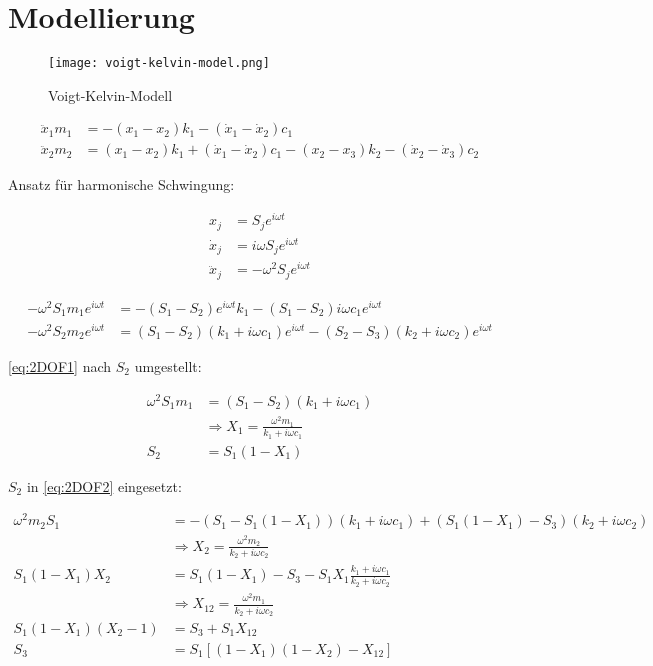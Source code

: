 \section{Modellierung}
\label{sec:modellierung}






\begin{figure}[ht]
    \centering
    \texttt{[image: voigt-kelvin-model.png]}
    \caption{Voigt-Kelvin-Modell}
\end{figure}

\begin{align}
\ddot x_1 m_1 &= -(x_1 - x_2) k_1 -(\dot x_1 - \dot x_2) c_1\\
\ddot x_2 m_2 &= (x_1 - x_2) k_1 + (\dot x_1 - \dot x_2) c_1 - (x_2 - x_3) k_2 - (\dot x_2 - \dot x_3) c_2
\end{align}

Ansatz für harmonische Schwingung:

\begin{align*}
x_j &= S_j e^{i \omega t}\\
\dot x_j &= i \omega S_j e^{i \omega t}\\
\ddot x_j &= - \omega^2 S_j e^{i \omega t}
\end{align*}

\begin{align}
- \omega^2 S_1 m_1 e^{i \omega t} &= - (S_1 - S_2) e^{i \omega t} k_1 - (S_1 - S_2) i \omega c_1 e^{i \omega t} \label{eq:2DOF1} \\
- \omega^2 S_2 m_2 e^{i \omega t} &= (S_1 - S_2)(k_1 + i \omega c_1) e^{i \omega t} - (S_2 - S_3)(k_2 + i \omega c_2) e^{i \omega t} \label{eq:2DOF2}
\end{align}

\cref{eq:2DOF1} nach $S_2$ umgestellt:

\begin{align*}
\omega^2 S_1 m_1 &= (S_1 - S_2)(k_1 + i \omega c_1) \\
&\Rightarrow X_1 = \frac{\omega^2 m_1}{k_1 + i \omega c_1}\\
S_2 &= S_1 (1 - X_1)
\end{align*}

$S_2$ in \cref{eq:2DOF2} eingesetzt:

\begin{align*}
\omega^2 m_2 S_1 &= - (S_1 - S_1 (1 - X_1)) (k_1 + i \omega c_1) + (S_1 (1 - X_1) - S_3) (k_2 + i \omega c_2)\\
&\Rightarrow X_2 = \frac{\omega^2 m_2}{k_2 + i \omega c_2}\\
S_1 (1 - X_1) X_2 &= S_1 (1-X_1) - S_3 - S_1 X_1 \frac{k_1 + i \omega c_1}{k_2 + i \omega c_2}\\
&\Rightarrow X_{12} = \frac{\omega^2 m_1}{k_2 + i \omega c_2}\\
S_1 (1 - X_1)(X_2 - 1) &= S_3 + S_1 X_{12}\\
S_3 &= S_1 [(1 - X_1)(1 - X_2) - X_{12}]
\end{align*}

